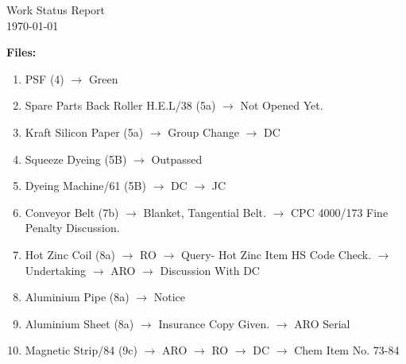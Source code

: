 \documentclass[12pt]{article}
\begin{document}
\small
\begin{center}
    Work Status Report
    \\
    {\today}
\end{center}

\noindent
\textbf{Files:}

\begin{enumerate}
\item
    PSF (4)
$\rightarrow$
Green


\item
    Spare Parts Back Roller H.E.L/38 (5a)
$\rightarrow$
Not Opened Yet.

\item
    Kraft Silicon Paper (5a)
$\rightarrow$
Group Change
$\rightarrow$
DC

\item
    Squeeze Dyeing (5B)
$\rightarrow$
Outpassed

\item
    Dyeing Machine/61 (5B)
$\rightarrow$
DC
$\rightarrow$
JC

\item
    Conveyor Belt (7b)
$\rightarrow$
Blanket, Tangential Belt.
$\rightarrow$
CPC 4000/173 Fine Penalty Discussion.

\item
    Hot Zinc Coil (8a)
$\rightarrow$
RO
$\rightarrow$
Query-
Hot Zinc Item HS Code Check.
$\rightarrow$
Undertaking
$\rightarrow$
ARO
$\rightarrow$
Discussion With DC

\item
    Aluminium Pipe (8a)
$\rightarrow$
Notice

\item
    Aluminium Sheet (8a)
$\rightarrow$
Insurance Copy Given.
$\rightarrow$
ARO Serial

\item
    Magnetic Strip/84 (9c)
$\rightarrow$
ARO
$\rightarrow$
RO
$\rightarrow$
DC
$\rightarrow$
Chem Item No. 73-84
\end{enumerate}
\end{document}
